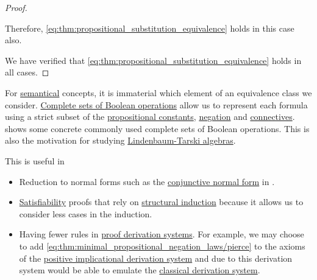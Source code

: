 \begin{proof}
\begin{itemize}
    Therefore, \eqref{eq:thm:propositional_substitution_equivalence} holds in this case also.
  \end{itemize}

  We have verified that \eqref{eq:thm:propositional_substitution_equivalence} holds in all cases.
\end{proof}

\begin{remark}\label{rem:smaller_propositional_language}
  For \hyperref[def:propositional_semantics]{semantical} concepts, it is immaterial which element of an equivalence class we consider. \hyperref[def:boolean_closure]{Complete sets of Boolean operations} allow us to represent each formula using a strict subset of the \hyperref[def:propositional_language/constants]{propositional constants}, \hyperref[def:propositional_language/negation]{negation} and \hyperref[def:propositional_language/connectives]{connectives}.  shows some concrete commonly used complete sets of Boolean operations. This is also the motivation for studying \hyperref[def:lindenbaum_tarski_algebra]{Lindenbaum-Tarski algebras}.

  This is useful in
  \begin{itemize}
    \item Reduction to normal forms such as the \hyperref[def:conjunctive_disjunctive_normal_form]{conjunctive normal form} in .

    \item \hyperref[def:propositional_semantics/satisfiability]{Satisfiability} proofs that rely on \hyperref[rem:structural_recursion_and_induction]{structural induction} because it allows us to consider less cases in the induction.

    \item Having fewer rules in \hyperref[alg:conjunctive_normal_form_reduction]{proof derivation systems}. For example, we may choose to add \eqref{eq:thm:minimal_propositional_negation_laws/pierce} to the axioms of the \hyperref[def:positive_implicational_propositional_derivation_system]{positive implicational derivation system} and due to  this derivation system would be able to emulate the \hyperref[def:propositional_derivation_system]{classical derivation system}.
  \end{itemize}
\end{remark}

